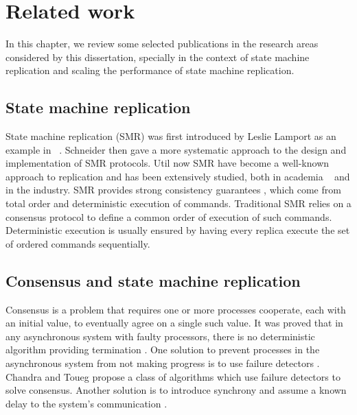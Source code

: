 \chapter[Related work]{Related work}
\label{sec:rw}

In this chapter, we review some selected publications in the research areas considered
by this dissertation, specially in the context of state machine replication and scaling
the performance of state machine replication.

\section{State machine replication}

State machine replication (SMR) was first introduced by Leslie Lamport as an
example in ~\cite{Lam78}. Schneider \cite{Sch90} then gave a more systematic
approach to the design and implementation of SMR protocols. Util now SMR have
become a well-known approach to replication and has been extensively studied,
both in academia ~\cite{Kapritsos:2012um, Kotla:2004ep, santos2013htsmr,
Mencius} and in the industry. SMR provides strong consistency guarantees , which
come from total order and deterministic execution of commands. Traditional SMR
relies on a consensus protocol to define a common order of execution of such
commands. Deterministic execution is usually ensured by having every replica
execute the set of ordered commands sequentially.


\section{Consensus and state machine replication}

Consensus \cite{Lam78, paprzycki:2001distributed} is a problem that requires one
or more processes cooperate, each with an initial value, to eventually agree on
a single such value. It was proved that in any asynchronous system with faulty
processors, there is no deterministic algorithm providing termination
\cite{FLP85}. One solution to prevent processes in the asynchronous system from
not making progress is to use failure detectors \cite{aguilera:2000failure}.
Chandra and Toueg \cite{CT96} propose a class of algorithms which use failure
detectors to solve consensus. Another solution is to introduce  synchrony and
assume a known delay to the system’s communication \cite{Aspnes:2003vp}.

